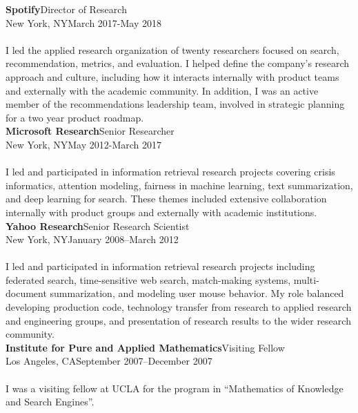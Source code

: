 \documentclass{article}
\begin{document}
\noindent\textbf{Spotify}\hfill Director of Research\\
New York, NY\hfill March 2017-May 2018\\\\
I led the applied research organization of twenty researchers focused on search, recommendation, metrics, and evaluation.  I helped define the company's research approach and culture, including how it interacts internally with product teams and externally with the academic community.  In addition, I was an active member of the recommendations leadership team, involved in strategic planning for a two year product roadmap.\\

\noindent\textbf{Microsoft Research}\hfill Senior Researcher\\
New York, NY\hfill May 2012-March 2017\\\\
I led and participated in information retrieval research projects covering crisis informatics,  attention modeling, fairness in machine learning, text summarization, and deep learning for search.  These themes included extensive collaboration internally with product groups and externally with academic institutions. \\

\noindent\textbf{Yahoo Research}\hfill Senior Research Scientist\\
New York, NY\hfill January 2008–March 2012\\\\
I led and participated in information retrieval research projects including federated search, time-sensitive web search, match-making systems, multi-document summarization, and modeling user mouse behavior.  My role balanced developing production code, technology transfer from research to applied research and engineering groups, and presentation of research results to the wider research community.  \\


\noindent\textbf{Institute for Pure and Applied Mathematics}\hfill Visiting Fellow\\
Los Angeles, CA\hfill September 2007–December 2007\\\\
I was a visiting fellow at UCLA for the program in ``Mathematics of Knowledge and Search Engines''.\\
\end{document}
